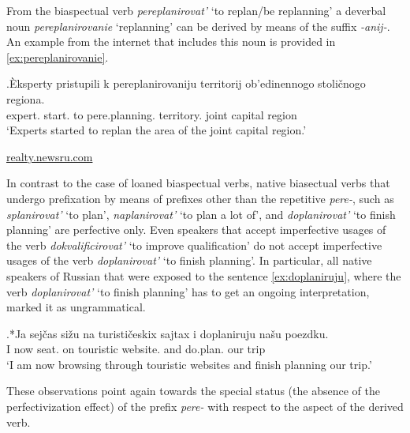 From the biaspectual verb \textit{pereplanirovat'} `to replan/be replanning' a deverbal noun \textit{pereplanirovanie} `replanning' can be derived by means of the suffix \textit{-anij-}. An example from the internet that includes this noun is provided in \ref{ex:pereplanirovanie}.

\exg.\label{ex:pereplanirovanie}\`{E}ksperty pristupili k pereplanirovaniju territorij ob'edinennogo stoli\v{c}nogo regiona.\\
expert. start. to pere.planning. territory. joint capital region\\
\trans `Experts started to replan the area of the joint capital region.'
\begin{flushright}
\url{realty.newsru.com}
\end{flushright}

In contrast to the case of loaned biaspectual verbs, native biasectual verbs that undergo prefixation by means of prefixes other than the repetitive \textit{pere-}, such as \textit{splanirovat'} `to plan', \textit{naplanirovat'} `to plan a lot of', and \textit{doplanirovat'} `to finish planning' are perfective only. Even speakers that accept imperfective usages of the verb \textit{dokvalificirovat'} `to improve qualification' do not accept imperfective usages of the verb \textit{doplanirovat'} `to finish planning'. In particular, all native speakers of Russian that were exposed to the sentence \ref{ex:doplaniruju}, where the verb \textit{doplanirovat'} `to finish planning' has to get an ongoing interpretation, marked it as ungrammatical.

\exg.*Ja sej\v{c}as si\v{z}u na turisti\v{c}eskix sajtax i doplaniruju na\v{s}u poezdku.\label{ex:doplaniruju}\\
I now seat. on touristic website. and do.plan. our trip\\
\trans `I am now browsing through touristic websites and finish planning our trip.'

These observations point again towards the special status (the absence of the perfectivization effect) of the prefix \textit{pere-} with respect to the aspect of the derived verb.

